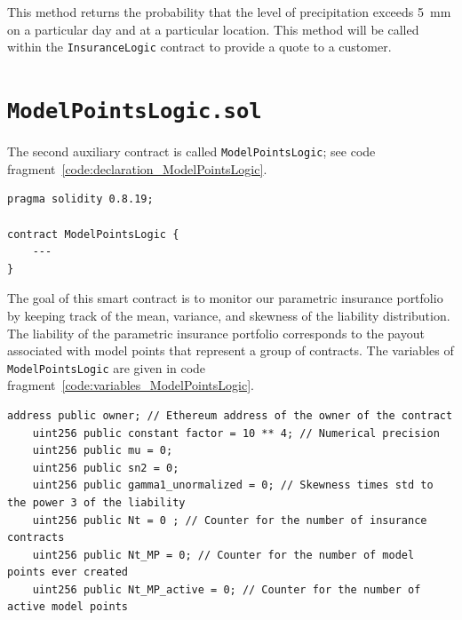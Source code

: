 \documentclass[10pt]{article}
\begin{document}
 This method returns the probability that the level of precipitation exceeds 5~mm on a particular day and at a particular location. This method will be called within the \texttt{InsuranceLogic} contract to provide a quote to a customer.

\section{\texttt{ModelPointsLogic.sol}}\label{sec:modelpointslogic_sol}

The second auxiliary contract is called \texttt{ModelPointsLogic}; see code fragment~\ref{code:declaration_ModelPointsLogic}.

\begin{codefragment}[!h]
\begin{lstlisting}[language=Solidity]
pragma solidity 0.8.19;

contract ModelPointsLogic {
    ---
}
\end{lstlisting}
    \caption{Declaring a compiler and define \texttt{ModelPointsLogic} contract.}
    \label{code:declaration_ModelPointsLogic}
\end{codefragment}

The goal of this smart contract is to monitor our parametric insurance portfolio by keeping track of the mean, variance, and skewness of the liability distribution. The liability of the parametric insurance portfolio corresponds to the payout associated with model points that represent a group of contracts. The variables of \texttt{ModelPointsLogic} are given in code fragment~\ref{code:variables_ModelPointsLogic}.


\begin{codefragment}[!h]
\begin{lstlisting}[language=Solidity]
    address public owner; // Ethereum address of the owner of the contract
    uint256 public constant factor = 10 ** 4; // Numerical precision
    uint256 public mu = 0;
    uint256 public sn2 = 0;
    uint256 public gamma1_unormalized = 0; // Skewness times std to the power 3 of the liability
    uint256 public Nt = 0 ; // Counter for the number of insurance contracts
    uint256 public Nt_MP = 0; // Counter for the number of model points ever created
    uint256 public Nt_MP_active = 0; // Counter for the number of active model points
\end{lstlisting}
    \caption{Variables of the \texttt{ModelPointsLogic} contract.}
    \label{code:variables_ModelPointsLogic}
\end{codefragment}
\end{document}
